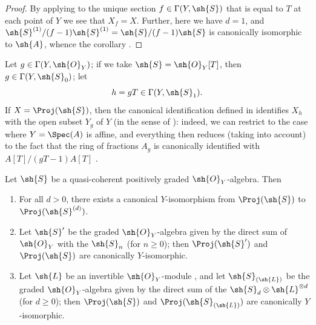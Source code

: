 \begin{proof}
By applying  to the unique section $f\in\Gamma(Y,\sh{S})$ that is equal to $T$ at each point of $Y$ we see that $X_f=X$.
Further, here we have $d=1$, and $\sh{S}^{(1)}/(f-1)\sh{S}^{(1)}=\sh{S}/(f-1)\sh{S}$ is canonically isomorphic to $\sh{A}$, whence the corollary .
\end{proof}

Let $g\in\Gamma(Y,\sh{O}_Y)$;
if we take $\sh{S}=\sh{O}_Y[T]$, then $g\in\Gamma(Y,\sh{S}_0)$;
let
\[
  h = gT\in\Gamma(Y,\sh{S}_1).
\]
If $X=\Proj(\sh{S})$, then the canonical identification defined in  identifies $X_h$ with the open subset $Y_g$ of $Y$ (in the sense of ):
indeed, we can restrict to the case where $Y=\Spec(A)$ is affine, and everything then reduces (taking  into account) to the fact that the ring of fractions $A_g$ is canonically identified with $A[T]/(gT-1)A[T]$ .

\begin{proposition}[3.1.8]
\label{II.3.1.8}
Let $\sh{S}$ be a quasi-coherent positively graded $\sh{O}_Y$-algebra.
Then
\begin{enumerate}
  \item[(i)] For all $d>0$, there exists a canonical $Y$-isomorphism from $\Proj(\sh{S})$ to $\Proj(\sh{S}^{(d)})$.
  \item[(ii)] Let $\sh{S}'$ be the graded $\sh{O}_Y$-algebra given by the direct sum of $\sh{O}_Y$ with the $\sh{S}_n$ (for $n\geq0$);
    then $\Proj(\sh{S}')$ and $\Proj(\sh{S})$ are canonically $Y$-isomorphic.
  \item[(iii)] Let $\sh{L}$ be an invertible $\sh{O}_Y$-module , and let $\sh{S}_{(\sh{L})}$ be the graded $\sh{O}_Y$-algebra given by the direct sum of the $\sh{S}_d\otimes\sh{L}^{\otimes d}$ (for $d\geq0$);
    then $\Proj(\sh{S})$ and $\Proj(\sh{S}_{(\sh{L})})$ are canonically $Y$-isomorphic.
\end{enumerate}
\end{proposition}

